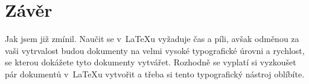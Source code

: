 \documentclass[11pt, a4paper]{article}
\begin{document}
\section*{Závěr}
Jak jsem již zmínil. Naučit se v~{\LaTeX}u vyžaduje čas a píli, avšak odměnou za vaši vytrvalost budou dokumenty na velmi vysoké typografické úrovni a rychlost, se kterou dokážete tyto dokumenty vytvářet. Rozhodně se vyplatí si vyzkoušet pár dokumentů v~{\LaTeX}u vytvořit a třeba si tento typografický nástroj oblíbíte.

\newpage	


\renewcommand{\refname}{Literatura}

\end{document}
